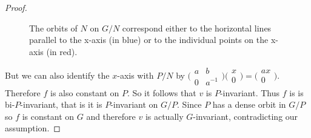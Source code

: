 \documentclass[
  12pt
]{article}
\numberwithin{equation}{section}
\theoremstyle{plain}
\newtheorem*{proof}{Proof}
\newcommand{\G}{\ensuremath{G}\xspace}
\newcommand{\ipmatrix}[1]{%
\ensuremath{\big(\begin{smallmatrix} #1 \end{smallmatrix}\big)}\xspace}
\begin{document}
\begin{proof}
    \begin{figure}
      \begin{center}
      \end{center}
      \caption{The orbits of $N$ on $G/N$ correspond either to the horizontal lines parallel to the x-axis (in blue) or to the individual points on the x-axis (in red). }
      \label{fig:n-orbits-in-r2}
    \end{figure}

    But we can also identify the $x$-axis with $P/N$ by $\ipmatrix{a & b \\ 0 &
    a^{-1}}\ipmatrix{x \\ 0} = \ipmatrix{ax \\ 0}$. Therefore $f$ is also
    constant on $P$. So it follows that $v$ is $P$-invariant. Thus $f$ is is
    bi-$P$-invariant, that is it is $P$-invariant on $G/P$. Since $P$ has a dense
    orbit in $G/P$ so $f$ is constant on $G$ and therefore $v$ is actually
    \G-invariant, contradicting our assumption.
  \end{proof}

\end{document}

